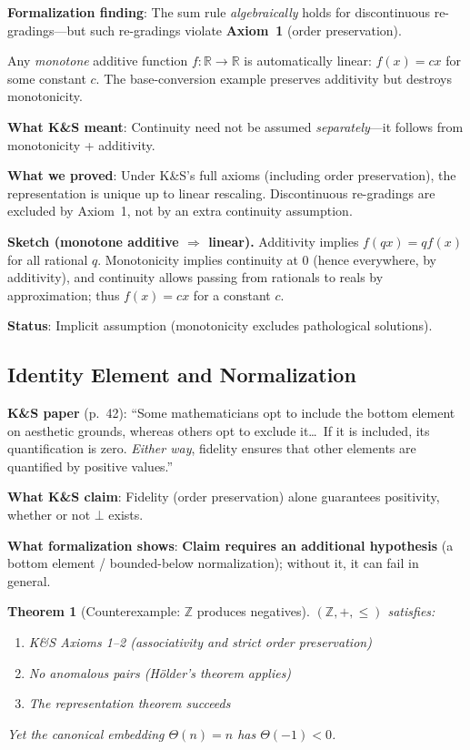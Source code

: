 \documentclass[11pt]{article}
\newtheorem{theorem}{Theorem}[section]
\begin{document}
\textbf{Formalization finding}: The sum rule \emph{algebraically} holds for discontinuous
re-gradings---but such re-gradings violate \textbf{Axiom~1} (order preservation).

Any \emph{monotone} additive function $f: \mathbb{R} \to \mathbb{R}$ is automatically
linear: $f(x) = cx$ for some constant $c$. The base-conversion example preserves
additivity but destroys monotonicity.

\textbf{What K\&S meant}: Continuity need not be assumed \emph{separately}---it follows
from monotonicity + additivity.

\textbf{What we proved}: Under K\&S's full axioms (including order preservation), the
representation is unique up to linear rescaling. Discontinuous re-gradings are excluded
by Axiom~1, not by an extra continuity assumption.

\textbf{Sketch (monotone additive $\Rightarrow$ linear).}
Additivity implies $f(qx)=qf(x)$ for all rational $q$.
Monotonicity implies continuity at $0$ (hence everywhere, by additivity), and continuity allows
passing from rationals to reals by approximation; thus $f(x)=cx$ for a constant $c$.

\textbf{Status}: Implicit assumption (monotonicity excludes pathological solutions).

\subsection{Identity Element and Normalization}

\textbf{K\&S paper} (p.~42): ``Some mathematicians opt to include the bottom element
on aesthetic grounds, whereas others opt to exclude it\ldots\ If it is included, its
quantification is zero. \emph{Either way}, fidelity ensures that other elements are
quantified by positive values.''

\textbf{What K\&S claim}: Fidelity (order preservation) alone guarantees positivity,
whether or not $\bot$ exists.

\textbf{What formalization shows}: \textbf{Claim requires an additional hypothesis}
(a bottom element / bounded-below normalization); without it, it can fail in general.

\begin{theorem}[Counterexample: $\mathbb{Z}$ produces negatives]
$(\mathbb{Z}, +, \leq)$ satisfies:
\begin{enumerate}[noitemsep]
\item K\&S Axioms 1--2 (associativity and strict order preservation)
\item No anomalous pairs (H\"{o}lder's theorem applies)
\item The representation theorem succeeds
\end{enumerate}
Yet the canonical embedding $\Theta(n) = n$ has $\Theta(-1) < 0$.
\end{theorem}
\end{document}
